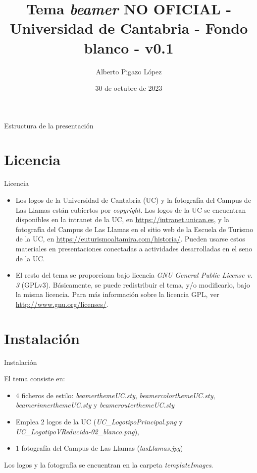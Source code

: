 \documentclass[handout,%
		aspectratio=43,%
		9pt]{beamer}
\title{Tema \emph{beamer} NO OFICIAL - Universidad de Cantabria - Fondo blanco - v0.1}
\date[Octubre 2023]{30 de octubre de 2023}
\author[Autor]{Alberto Pigazo López}
\institute[Inst]{Dpto. de Ingeniería Informática y Electrónica}
\begin{document}
\begin{frame}
\titlepage
\end{frame}

\begin{frame}{Estructura de la presentación}
		\tableofcontents
\end{frame}

\section{Licencia}
\begin{frame}{Licencia}

\begin{itemize}
\item Los logos de la Universidad de Cantabria (UC) y la fotografía del Campus de Las Llamas están cubiertos por \emph{copyright}. Los logos de la UC se encuentran disponibles en la intranet de la UC, en \url{https://intranet.unican.es}, y la fotografía del Campus de Las Llamas en el sitio web de la Escuela de Turismo de la UC, en \url{https://euturismoaltamira.com/historia/}. Pueden usarse estos materiales en presentaciones conectadas a actividades desarrolladas en el seno de la UC.
\item El resto del tema se proporciona bajo licencia \emph{GNU General Public License v. 3} (GPLv3). Básicamente, se puede redistribuir el tema, y/o modificarlo, bajo la misma licencia. Para más información sobre la licencia GPL, ver \url{http://www.gnu.org/licenses/}.
\end{itemize}

\end{frame}

\section{Instalación}
\begin{frame}{Instalación}

El tema consiste en:
\begin{itemize}
\item 4 ficheros de estilo: \textit{beamerthemeUC.sty}, \textit{beamercolorthemeUC.sty}, \textit{beamerinnerthemeUC.sty} y \textit{beamerouterthemeUC.sty}
\item Emplea 2 logos de la UC (\textit{UC\_LogotipoPrincipal.png} y \textit{UC\_LogotipoVReducida-02\_blanco.png}),
\item 1 fotografía del Campus de Las Llamas (\textit{lasLlamas.jpg})
\end{itemize}
Los logos y la fotografía se encuentran en la carpeta \textit{templateImages}.

\end{frame}
\end{document}
